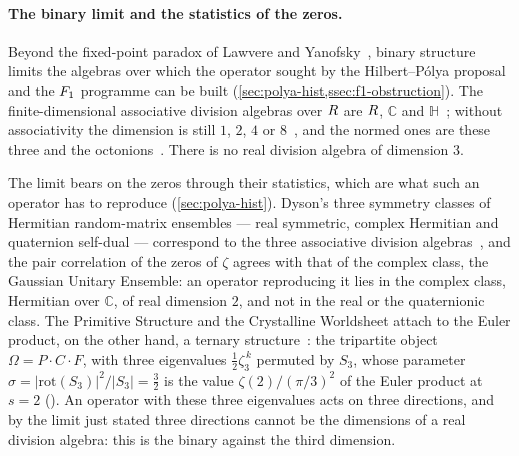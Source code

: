 \medskip
\paragraph{The binary limit and the statistics of the zeros.}
Beyond the fixed-point paradox of Lawvere and Yanofsky~\cite{lawvere69,yanofsky03}, binary structure limits the algebras over which the operator sought by the
Hilbert--P\'olya proposal and the $F_1$ programme can be built (\cref{sec:polya-hist,ssec:f1-obstruction}).
The finite-dimensional associative division algebras over $R$ are $R$, $\mathbb{C}$ and
$\mathbb{H}$~\cite{frobenius1878}; without associativity the dimension is still $1$, $2$, $4$ or
$8$~\cite{bottmilnor58,kervaire58}, and the normed ones are these three and the
octonions~\cite{hurwitz1898,baez02}.  There is no real division algebra of dimension $3$.

The limit bears on the zeros through their statistics, which are what such an operator has to reproduce
(\cref{sec:polya-hist}).  Dyson's three symmetry classes of Hermitian random-matrix ensembles --- real
symmetric, complex Hermitian and quaternion self-dual --- correspond to the three associative division
algebras~\cite{dyson62threefold}, and the pair correlation of the zeros of $\zeta$ agrees with that of the
complex class, the Gaussian Unitary Ensemble: an operator reproducing it lies in the complex class, Hermitian over $\mathbb{C}$, of real dimension $2$, and not in the real or the quaternionic class.
The Primitive Structure and the Crystalline Worldsheet attach to the Euler product, on the other hand, a ternary
structure~\cite{gonzalez25hp,gonzalez26cw}: the tripartite object $\Omega=P\cdot C\cdot F$, with three eigenvalues
$\tfrac12\zeta_3^{\,k}$ permuted by $S_3$, whose parameter $\sigma=|\mathrm{rot}(S_3)|^2/|S_3|=\tfrac32$ is the value
$\zeta(2)/(\pi/3)^2$ of the Euler product at $s=2$ ().  An
operator with these three eigenvalues acts on three directions, and by the limit just stated three directions
cannot be the dimensions of a real division algebra: this is the binary against the third dimension.

\medskip
